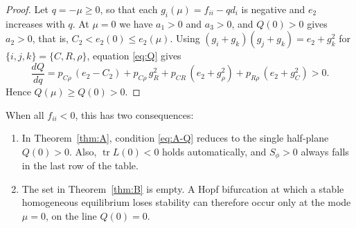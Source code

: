 \documentclass[11pt]{article}
\theoremstyle{remark}
\begin{document}
\begin{proof}
Let $q=-\mu\ge0$, so that each $g_i(\mu)=f_{ii}-qd_i$ is negative and $e_2$ increases with $q$. At $\mu=0$ we have $a_1>0$ and $a_3>0$, and $Q(0)>0$ gives $a_2>0$, that is, $C_2<e_2(0)\le e_2(\mu)$. Using $(g_i+g_k)(g_j+g_k)=e_2+g_k^2$ for $\{i,j,k\}=\{C,R,\rho\}$, equation \eqref{eq:Q} gives
\[
\frac{dQ}{dq}=p_{C\rho}\,(e_2-C_2)+p_{C\rho}\,g_R^2+p_{CR}\,(e_2+g_\rho^2)+p_{R\rho}\,(e_2+g_C^2)>0.
\]
Hence $Q(\mu)\ge Q(0)>0$.
\end{proof}

When all $f_{ii}<0$, this has two consequences:
\begin{enumerate}
\item In Theorem~\ref{thm:A}, condition \eqref{eq:A-Q} reduces to the single half-plane $Q(0)>0$. Also, $\operatorname{tr}L(0)<0$ holds automatically, and $S_\phi>0$ always falls in the last row of the table.
\item The set in Theorem~\ref{thm:B} is empty. A Hopf bifurcation at which a stable homogeneous equilibrium loses stability can therefore occur only at the mode $\mu=0$, on the line $Q(0)=0$.
\end{enumerate}
\end{document}
